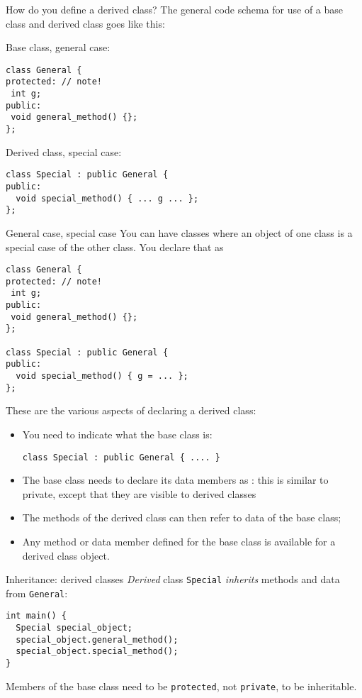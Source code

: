 How do you define a derived class?
The general code schema for use of a base class and derived class goes like this:

\begin{multicols}{2}
Base class, general case:
\begin{lstlisting}
class General {
protected: // note!
 int g;
public:
 void general_method() {};
};
\end{lstlisting}
\columnbreak
Derived class, special case:
\begin{lstlisting}
class Special : public General {
public:
  void special_method() { ... g ... };
};
\end{lstlisting}
\end{multicols}

\begin{slide}{General case, special case}
  \label{sl:obj-case}
  You can have classes where an object of one class is a special case of
  the other class. You declare that as
\begin{lstlisting}
class General {
protected: // note!
 int g;
public:
 void general_method() {};
};

class Special : public General {
public:
  void special_method() { g = ... };
};
\end{lstlisting}
\end{slide}

These are the various aspects of declaring a derived class:
\begin{itemize}
\item You need to indicate what the base class is:
\begin{lstlisting}
class Special : public General { .... }
\end{lstlisting}
\item The base class needs to declare its data members as
  : this is similar to private, except that
  they are visible to derived classes
\item The methods of the derived class can then refer to data of the
  base class;
\item Any method or data member defined for the base class is available
  for a derived class object.
\end{itemize}

\begin{slide}{Inheritance: derived classes}
  \label{sl:obj-derive}
  \emph{Derived} class \lstinline{Special}
  \emph{inherits} methods and data from
   \lstinline{General}:
\begin{lstlisting}
int main() {
  Special special_object;
  special_object.general_method();
  special_object.special_method();
}
\end{lstlisting}
Members of the base class need to be \lstinline{protected},
not \lstinline{private}, to be inheritable.
\end{slide}

